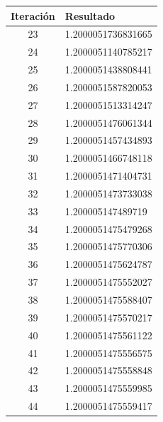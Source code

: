 \documentclass[titlepage,a4paper]{article}
\begin{document}
\begin{multicols}{2}
\begin{center}
\begin{tabular}{| c | l |}
           \hline
    \end{tabular}
\end{center}
        \begin{center}
    \begin{tabular}{| c | l |}
    \hline
    Iteración & Resultado \\ \hline
23     &  1.2000051736831665 \\
24     &  1.2000051140785217 \\
25     &  1.2000051438808441 \\
26     &  1.2000051587820053 \\
27     &  1.2000051513314247 \\
28     &  1.2000051476061344 \\
29     &  1.2000051457434893 \\
30     &  1.2000051466748118 \\
31     &  1.2000051471404731 \\
32     &  1.2000051473733038 \\
33     &  1.200005147489719 \\
34     &  1.2000051475479268 \\
35     &  1.2000051475770306 \\
36     &  1.2000051475624787 \\
37     &  1.2000051475552027 \\
38     &  1.2000051475588407 \\
39     &  1.2000051475570217 \\
40     &  1.2000051475561122 \\
41     &  1.2000051475556575 \\
42     &  1.2000051475558848 \\
43     &  1.2000051475559985 \\
44     &  1.2000051475559417 \\
    \hline
    \end{tabular}
\end{center}
\end{multicols}
\end{document}
